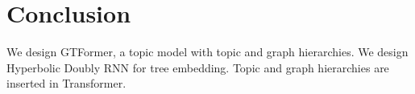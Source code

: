 \section{Conclusion}

We design GTFormer, a topic model with topic and graph hierarchies. We design Hyperbolic Doubly RNN for tree embedding. Topic and graph hierarchies are inserted in Transformer. %
